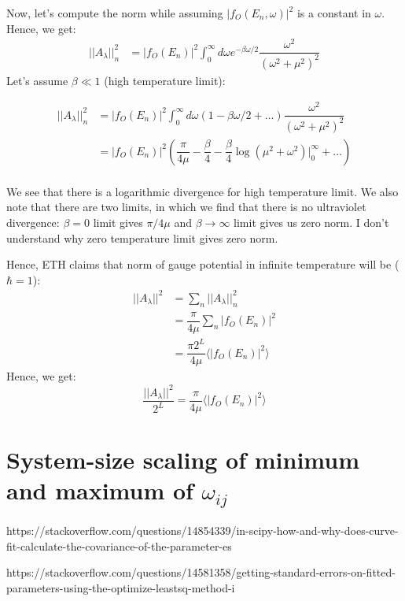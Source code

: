 \documentclass[11pt,a4paper]{article}
\begin{document}
Now, let's compute the norm while assuming $ |f_O(E_n, \omega)|^2 $ is a constant in $\omega$. Hence, we get:
\begin{align*}
||A_{\lambda}||^2_{n} &=  |f_O(E_n)|^2 \int_0^{\infty} d \omega e^{-\beta \omega/2} \dfrac{\omega^2}{(\omega^2 + \mu^2)^2} 
\end{align*}
Let's assume $\beta \ll 1$ (high temperature limit):

\begin{align*}
||A_{\lambda}||^2_{n} &=  |f_O(E_n)|^2 \int_0^{\infty} d \omega \left(1-\beta \omega/2 + \ldots \right) \dfrac{\omega^2}{(\omega^2 + \mu^2)^2}  \\
&=|f_O(E_n)|^2\left(\dfrac{\pi}{4 \mu}-\dfrac{\beta }{4}-\dfrac{\beta }{4} \log (\mu^2+ \omega^2)|_0^{\infty}  + \ldots \right) \\
\end{align*}

We see that there is a logarithmic divergence for high temperature limit. We also note that there are two limits, in which we find that there is no ultraviolet divergence: $\beta =0$ limit gives $\pi/ 4 \mu$ and $\beta \rightarrow \infty$ limit gives us zero norm. I don't understand why zero temperature limit gives zero norm.


Hence, ETH claims that norm of gauge potential in infinite temperature will be ($\hbar=1$):
\begin{align*}
||A_{\lambda}||^2 &= \sum_n ||A_{\lambda}||^2_{n} \\
&= \dfrac{\pi}{4 \mu} \sum_n |f_O(E_n)|^2\\
&= \dfrac{\pi 2^L}{4 \mu} \langle |f_O(E_n)|^2  \rangle
\end{align*}
Hence, we get:
\begin{equation}
\boxed{
\dfrac{||A_{\lambda}||^2} {2^L}= \dfrac{\pi }{4 \mu} \langle |f_O(E_n)|^2  \rangle}
\end{equation}



\section{System-size scaling of minimum and maximum of $\omega_{ij}$}

 
https://stackoverflow.com/questions/14854339/in-scipy-how-and-why-does-curve-fit-calculate-the-covariance-of-the-parameter-es

https://stackoverflow.com/questions/14581358/getting-standard-errors-on-fitted-parameters-using-the-optimize-leastsq-method-i 
 
\end{document}
